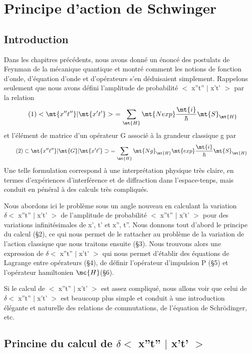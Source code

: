 \chapter{Principe d'action de Schwinger}%
\section{Introduction}%
Dans les chapitres précédents, nous avons donné un énoncé
des postulats de Feynman de la mécanique quantique et montré comment
les notions de fonction d'onde, d'équation d'onde et d'opérateurs s'en
déduisaient simplement. Rappelons seulement que nous avons défini l'amplitude de probabilité $<$ x''t'' $|$ x't' $>$ par la relation
\[
\tag{1}<\mt{ x''t'' }|\mt{ x't' }>\ =\sum_\mt{H}\mt{ N exp }\frac{\mt{i}}{\hbar}\mt{ S}_\mt{H}
\]
et l'élément de matrice d'un opérateur G associé à la grandeur classique
g par
\[
\tag{2}\subset \mt{x''t'' }|\mt{ G }|\mt{ x't'}\supset\ =
\sum_\mt{H}\mt{ N g}_\mt{H}\mt{ exp }\frac{\mt{i}}{\hbar}\mt{ S}_\mt{H}
\]
Une telle formulation correspond à une interprétation physique très claire,
en termes d'expériences d'interférence et de diffraction dans l'espace-tenps,
mais conduit en pénéral à des calculs très compliqués.

Nous abordons ici le problème sous un angle nouveau en calculant
la variation $\delta<$ x''t'' $|$ x't' $>$ de l'amplitude de probabilité $<$ x''t'' $|$ x't' $>$
pour des variations infinitésimales de x', t' et x'', t''. Nous donnons tout
d'abord le principe du calcul (\S 2), ce qui nous permet de le rattacher
au problème de la variation de l'action classique que nous traitons ensuite
(\S 3). Nous trouvons alors une expression de $\delta<$ x''t'' $|$ x't' $>$ qui nous
permet d'établir des équations de Lagrange entre opérateurs (\S 4), de définir
l'opérateur d'impulsion P (\S 5) et l'opérateur hamiltonien $\mc{H}$(\S 6).

Si le calcul de $<$ x''t'' $|$ x't' $>$ est assez compliqué, nous allons
voir que celui de $\delta<$ x''t'' $|$ x't' $>$ est beaucoup plus simple et conduit à
une introduction élégante et naturelle des relations de commutations, de
l'équation de Schrödinger, etc.


\section{Princine du calcul de $\delta<$ x''t'' $|$ x't' $>$}%

